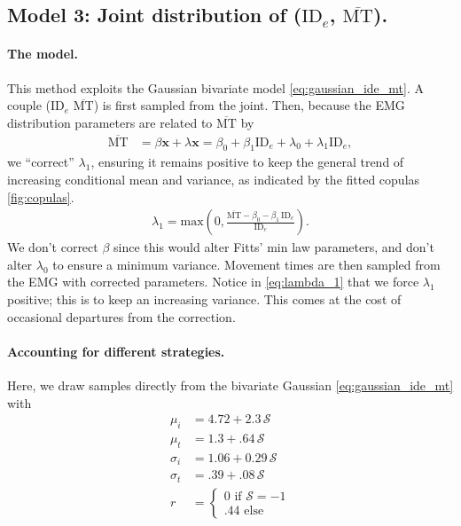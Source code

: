 \documentclass[manuscript,review,anonymous]{acmart}
\newcommand{\mmt}{\ensuremath{\overline{\text{MT}}}\xspace}
\newcommand{\ide}{\ensuremath{{\text{ID}_e}}\xspace}
\begin{document}
\subsection{Model 3: Joint distribution of (\ide, \mmt).}


\paragraph{The model.} This method exploits the Gaussian bivariate model \autoref{eq:gaussian_ide_mt}. A couple ($\ide$ $\mmt$) is first sampled from the joint.
Then, because the EMG distribution parameters are related to \mmt by
\begin{align}
	\mmt & = \beta \mathbf{x} + \lambda \mathbf{x} = \beta_0 + \beta_1 \ide + \lambda_0 + \lambda_1 \ide,
\end{align}
we ``correct'' $\lambda_1$, ensuring it remains positive to keep the general trend of increasing conditional mean and variance, as indicated \eg by the fitted copulas \autoref{fig:copulas}.
\begin{align}
	\lambda_1 = \text{max}(0, \frac{\mmt - \beta_0 - \beta_1\,\ide}{\ide}). \label{eq:lambda_1}
\end{align}
We don't correct $\beta$ since this would alter Fitts' min law parameters, and don't alter $\lambda_0$ to ensure a minimum variance.
Movement times are then sampled from the EMG with corrected parameters. Notice in \autoref{eq:lambda_1} that we force $\lambda_1$ positive; this is to keep an increasing variance. This comes at the cost of occasional departures from the correction.

\paragraph{Accounting for different strategies.} Here, we draw samples directly from the bivariate Gaussian \autoref{eq:gaussian_ide_mt} with
\begin{align}
	\mu_i    & = 4.72 + 2.3\,\mathcal{S}        \\
	\mu_t    & = 1.3 + .64\,\mathcal{S}         \\
	\sigma_i & = 1.06 + 0.29\,\mathcal{S}       \\
	\sigma_t & = .39 + .08\,\mathcal{S}         \\
	r        & = \begin{cases}
		             0 \text{ if } \mathcal{S} = -1 \\
		             .44 \text{ else}
	             \end{cases}
\end{align}
\end{document}

